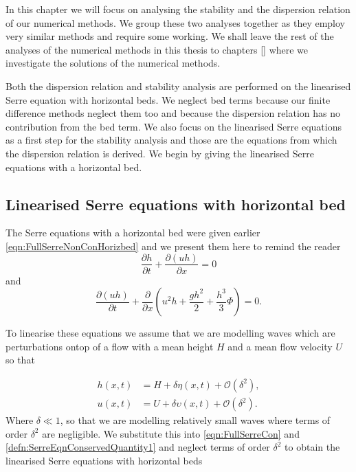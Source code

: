 In this chapter we will focus on analysing the stability and the dispersion relation of our numerical methods. We group these two analyses together as they employ very similar methods and require some working. We shall leave the rest of the analyses of the numerical methods in this thesis to chapters [] where we investigate the solutions of the numerical methods.

Both the dispersion relation and stability analysis are performed on the linearised Serre equation with horizontal beds. We neglect bed terms because our finite difference methods neglect them too and because the dispersion relation has no contribution from the bed term. We also focus on the linearised Serre equations as a first step for the stability analysis and those are the equations from which the dispersion relation is derived. We begin by giving the linearised Serre equations with a horizontal bed.
 
\subsection{Linearised Serre equations with horizontal bed}
The Serre equations with a horizontal bed were given earlier \eqref{eqn:FullSerreNonConHorizbed} and we present them here to remind the reader
\begin{equation*}
\frac{\partial h}{\partial t} + \dfrac{\partial (uh)}{\partial x} = 0
\end{equation*}
and
\begin{equation*}
\dfrac{\partial (uh)}{\partial t} + \dfrac{\partial}{\partial x} \left ( u^2h + \dfrac{gh^2}{2} + \dfrac{h^3}{3}{ \Phi }  \right ) = 0.
\end{equation*}

To linearise these equations we assume that we are modelling waves which are perturbations ontop of a flow with a mean height $H$ and a mean flow velocity $U$ so that

\begin{align}
\label{eq:pertubation}
h(x,t) &= H + \delta \eta(x,t) + \mathcal{O}\left(\delta^2 \right), \\
u(x,t) &= U + \delta \upsilon(x,t) + \mathcal{O}\left(\delta^2 \right).
\end{align}
Where $\delta \ll 1$, so that we are modelling relatively small waves where terms of order $\delta^2$ are negligible. We substitute this into \eqref{eqn:FullSerreCon} and \eqref{defn:SerreEqnConservedQuantity1} and neglect terms of order $\delta^2$ to obtain the linearised Serre equations with horizontal beds

